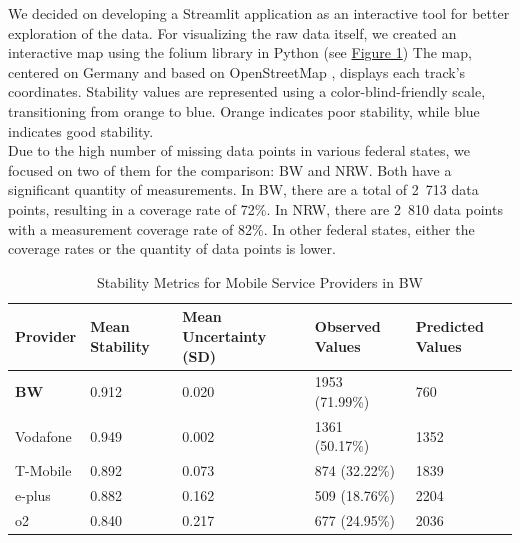 \documentclass{article}
\theoremstyle{plain}
\theoremstyle{definition}
\theoremstyle{remark}
\begin{document}
\newline
We decided on developing a Streamlit application as an interactive tool for better exploration of the data.
For visualizing the raw data itself, we created an interactive map using the folium library in Python (see \hyperref[fig:mapGauss]{Figure 1})
The map, centered on Germany and based on OpenStreetMap \citep{OpenStreetMap}, displays each track's coordinates. Stability values are represented using a color-blind-friendly scale, transitioning from orange to blue. Orange indicates poor stability, while blue indicates good stability.
\newline
\\
Due to the high number of missing data points in various federal states, we focused on two of them for the comparison: \gls*{BW} and \gls*{NRW}. Both have a significant quantity of measurements. In \gls*{BW}, there are a total of 2~713 data points, resulting in a coverage rate of 72\%. In \gls*{NRW}, there are 2~810 data points with a measurement coverage rate of 82\%. In other federal states, either the coverage rates or the quantity of data points is lower.
\begin{table}[htbp]
\centering
\caption{Stability Metrics for Mobile Service Providers in \gls*{BW}}
\label{tab:stability_metrics_bw}
\begin{adjustbox}{width=\textwidth}
\begin{tabular}{@{}lllll@{}}
\toprule
\textbf{Provider} & \textbf{Mean Stability} & \textbf{Mean Uncertainty (SD)} & \textbf{Observed Values} & \textbf{Predicted Values} \\
\midrule
\textbf{\gls*{BW}} & 0.912 & 0.020 & 1953  (71.99\%) & 760 \\
Vodafone & 0.949 & 0.002 & 1361 (50.17\%) & 1352 \\
T-Mobile & 0.892 & 0.073 & 874 (32.22\%) & 1839 \\
e-plus & 0.882 & 0.162 & 509 (18.76\%) & 2204 \\
o2 & 0.840 & 0.217 & 677 (24.95\%) & 2036 \\
\bottomrule
\end{tabular}
\end{adjustbox}
\end{table}
\end{document}

